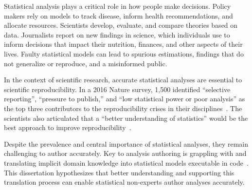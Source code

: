 
Statistical analysis plays a critical role in how people make decisions. Policy
makers rely on models to track disease, inform health recommendations, and
allocate resources. Scientists develop, evaluate, and compare theories based on
data. Journalists report on new findings in science, which
individuals use to inform decisions that impact their nutrition, finances, and
other aspects of their lives. Faulty statistical models can lead to spurious
estimations, findings that do not generalize or reproduce, and a misinformed
public. 


In the context of scientific research, accurate statistical analyses are
essential to scientific reproducibility. In a 2016 Nature survey, 1,500
identified ``selective reporting'', ``pressure to publish,'' and ``low
statistical power or poor analysis'' as the top three contributors to the
reproducibility crises in their disciplines~\cite{baker2016NatureSurvey}. The
scientists also articulated that a ``better understanding of statistics'' would
be the best approach to improve reproducibility~\cite{baker2016NatureSurvey}. 

Despite the prevalence and central importance of statistical analyses, they
remain challenging to author accurately. Key to analysis authoring is grappling
with and translating implicit domain knowledge into statistical models
executable in code~\cite{wild1999statisticalThinking,carver2016guidelines}. This
dissertation hypothesizes that better understanding and supporting this
translation process can enable statistical non-experts author analyses
accurately. 


